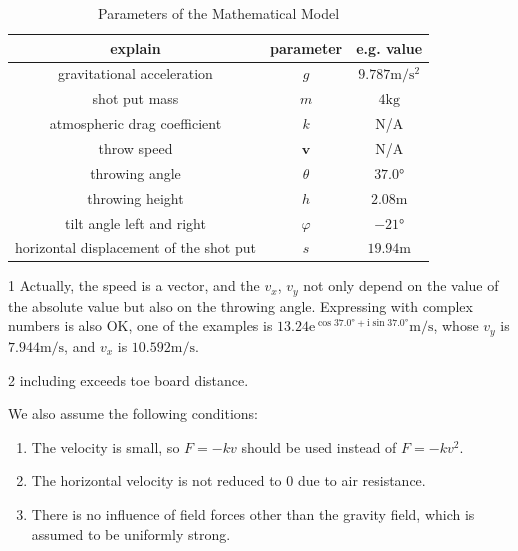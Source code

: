 \documentclass{article}
\begin{document}
\begin{table}[H]
    \centering
    \begin{threeparttable}
        \begin{tabular}{ccc}
            \hline
            \textbf{explain} & \textbf{parameter} & \textbf{e.g. value} \\
            \hline
            gravitational acceleration & $g$ & $9.787\si{\meter/\second^2}$ \\
            shot put mass & $m$ & $4\si{\kilo\gram}$ \\
            atmospheric drag coefficient & $k$ & N/A \\
            throw speed & $\boldsymbol{v}$ & N/A \tnote{1} \\
            throwing angle & $\theta$ & $37.0\si{\degree}$ \\
            throwing height & $h$ & $2.08\si{\meter}$ \\
            tilt angle left and right & $\varphi$ & $-21\si{\degree}$ \\
            horizontal displacement of the shot put \tnote{2} & $s$ & $19.94\si{\meter}$ \\
            \hline
        \end{tabular}
        \begin{tablenotes}
            \item [1] Actually, the speed is a vector, and the $v_x$, $v_y$ not only depend on the value of the absolute value but also on the throwing angle. Expressing with complex numbers is also OK, one of the examples is $13.24\mathrm{e}^{\cos37.0\si{\degree}+\mathrm{i}\sin37.0\si{\degree}}\si{\meter/\second}$, whose $v_y$ is $7.944\si{\meter/\second}$, and $v_x$ is $10.592\si{\meter/\second}$.
            \item [2] including exceeds toe board distance.
        \end{tablenotes}
    \end{threeparttable}
    \caption{Parameters of the Mathematical Model}
    \label{table:parameters}
\end{table}

We also assume the following conditions:

\begin{enumerate}
    \item The velocity is small, so $F=-kv$ should be used instead of $F=-kv^2$.
    \item The horizontal velocity is not reduced to $0$ due to air resistance.
    \item There is no influence of field forces other than the gravity field, which is assumed to be uniformly strong.
\end{enumerate}
\end{document}
